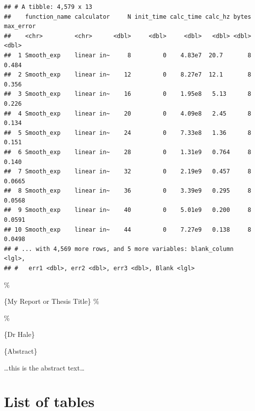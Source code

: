 \documentclass[
  letterpaper,
  landscape]{article}
\author{}
\date{\vspace{-2.5em}}
\begin{document}
\begin{verbatim}
## # A tibble: 4,579 x 13
##    function_name calculator     N init_time calc_time calc_hz bytes max_error
##    <chr>         <chr>      <dbl>     <dbl>     <dbl>   <dbl> <dbl>     <dbl>
##  1 Smooth_exp    linear in~     8         0    4.83e7  20.7       8    0.484 
##  2 Smooth_exp    linear in~    12         0    8.27e7  12.1       8    0.356 
##  3 Smooth_exp    linear in~    16         0    1.95e8   5.13      8    0.226 
##  4 Smooth_exp    linear in~    20         0    4.09e8   2.45      8    0.134 
##  5 Smooth_exp    linear in~    24         0    7.33e8   1.36      8    0.151 
##  6 Smooth_exp    linear in~    28         0    1.31e9   0.764     8    0.140 
##  7 Smooth_exp    linear in~    32         0    2.19e9   0.457     8    0.0665
##  8 Smooth_exp    linear in~    36         0    3.39e9   0.295     8    0.0568
##  9 Smooth_exp    linear in~    40         0    5.01e9   0.200     8    0.0591
## 10 Smooth_exp    linear in~    44         0    7.27e9   0.138     8    0.0498
## # ... with 4,569 more rows, and 5 more variables: blank_column <lgl>,
## #   err1 <dbl>, err2 <dbl>, err3 <dbl>, Blank <lgl>
\end{verbatim}


\newpage

\%

\LARGE\{My Report or Thesis Title\} \%

\bigskip                \% \bigskip

\large\{Dr Hale\}

\newpage

\begin{center}

\large\{Abstract\}

\end{center}

\bigskip

\ldots this is the abstract text\ldots{}

\newpage

\tableofcontents

\newpage

\hypertarget{list-of-tables}{%
\section*{List of tables}\label{list-of-tables}}

\renewcommand{\listtablename}{}
\end{document}
